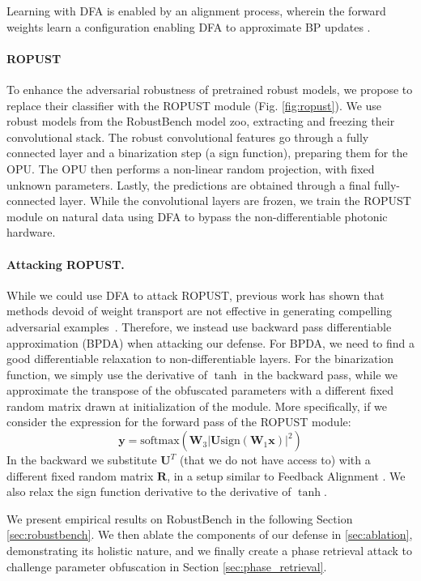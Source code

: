 \documentclass{article}
\begin{document}
Learning with DFA is enabled by an alignment process, wherein the forward weights learn a configuration enabling DFA to approximate BP updates \cite{refinetti2020dynamics}.

\paragraph{ROPUST} 
To enhance the adversarial robustness of pretrained robust models, we propose to replace their classifier with the ROPUST module (Fig. \ref{fig:ropust}). We use robust models from the RobustBench model zoo, extracting and freezing their convolutional stack. The robust convolutional features go through a fully connected layer and a binarization step (a sign function), preparing them for the OPU. The OPU then performs a non-linear random projection,  with fixed unknown parameters. Lastly, the predictions are obtained through a final fully-connected layer. While the convolutional layers are frozen, we train the ROPUST module on natural data using DFA to bypass the non-differentiable photonic hardware. 

\paragraph{Attacking ROPUST.} While we could use DFA to attack ROPUST, previous work has shown that methods devoid of weight transport are not effective in generating compelling adversarial examples~\cite{Akrout2019OnTA}. Therefore, we instead use backward pass differentiable approximation (BPDA) when attacking our defense. For BPDA, we need to find a good differentiable relaxation to non-differentiable layers. For the binarization function, we simply use the derivative of $\tanh$ in the backward pass, while we approximate the transpose of the obfuscated parameters with a different fixed random matrix drawn at initialization of the module. More specifically, if we consider the expression for the forward pass of the ROPUST module:
\begin{equation}
    \mathbf{y} = \mbox{softmax}(\mathbf{W}_3\lvert\mathbf{U} \mbox{sign}(\mathbf{W}_1 \mathbf{x})\rvert^2)
\end{equation}
In the backward we substitute $\mathbf{U}^T$ (that we do not have access to) with a different fixed random matrix $\mathbf{R}$, in a setup similar to Feedback Alignment \cite{Lillicrap2014RandomFW}. We also relax the sign function derivative to the derivative of $\tanh$.

We present empirical results on RobustBench in the following Section \ref{sec:robustbench}. We then ablate the components of our defense in \ref{sec:ablation}, demonstrating its holistic nature, and we finally create a phase retrieval attack to challenge parameter obfuscation in Section \ref{sec:phase_retrieval}.
\end{document}
